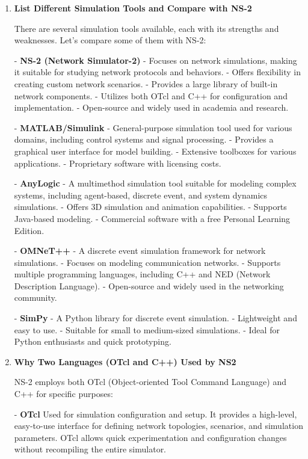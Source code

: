 \documentclass[11pt]{article}
\begin{document}
\begin{enumerate}
    \item \textbf{List Different Simulation Tools and Compare with NS-2}

          There are several simulation tools available, each with its strengths and weaknesses. Let's compare some of them with NS-2:

          - \textbf{NS-2 (Network Simulator-2)}
          - Focuses on network simulations, making it suitable for studying network protocols and behaviors.
          - Offers flexibility in creating custom network scenarios.
          - Provides a large library of built-in network components.
          - Utilizes both OTcl and C++ for configuration and implementation.
          - Open-source and widely used in academia and research.

          - \textbf{MATLAB/Simulink}
          - General-purpose simulation tool used for various domains, including control systems and signal processing.
          - Provides a graphical user interface for model building.
          - Extensive toolboxes for various applications.
          - Proprietary software with licensing costs.

          - \textbf{AnyLogic}
          - A multimethod simulation tool suitable for modeling complex systems, including agent-based, discrete event, and system dynamics simulations.
          - Offers 3D simulation and animation capabilities.
          - Supports Java-based modeling.
          - Commercial software with a free Personal Learning Edition.

          - \textbf{OMNeT++}
          - A discrete event simulation framework for network simulations.
          - Focuses on modeling communication networks.
          - Supports multiple programming languages, including C++ and NED (Network Description Language).
          - Open-source and widely used in the networking community.

          - \textbf{SimPy}
          - A Python library for discrete event simulation.
          - Lightweight and easy to use.
          - Suitable for small to medium-sized simulations.
          - Ideal for Python enthusiasts and quick prototyping.

    \item \textbf{Why Two Languages (OTcl and C++) Used by NS2}

          NS-2 employs both OTcl (Object-oriented Tool Command Language) and C++ for specific purposes:

          - \textbf{OTcl} Used for simulation configuration and setup. It provides a high-level, easy-to-use interface for defining network topologies, scenarios, and simulation parameters. OTcl allows quick experimentation and configuration changes without recompiling the entire simulator.


\end{enumerate}
\end{document}
